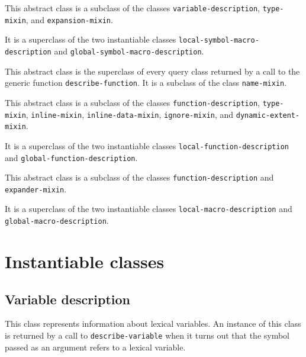 {\footnotesize
{}
}

This abstract class is a subclass of the classes
\texttt{variable-description}, \texttt{type-mixin}, and
\texttt{expansion-mixin}.

It is a superclass of the two instantiable classes
\texttt{local-symbol-macro-description} and
\texttt{global-symbol-macro-description}.

{\footnotesize
{}
}

This abstract class is the superclass of every query class returned by
a call to the generic function \texttt{describe-function}.  It is a
subclass of the class \texttt{name-mixin}.

{\footnotesize
{}
}

This abstract class is a subclass of the classes
\texttt{function-description}, \texttt{type-mixin},
\texttt{inline-mixin}, \texttt{inline-data-mixin},
\texttt{ignore-mixin}, and \texttt{dynamic-extent-mixin}.

It is a superclass of the two instantiable classes
\texttt{local-function-description} and
\texttt{global-function-description}.

{\footnotesize
{}
}

This abstract class is a subclass of the classes
\texttt{function-description} and \texttt{expander-mixin}.

It is a superclass of the two instantiable classes
\texttt{local-macro-description} and
\texttt{global-macro-description}.

\section{Instantiable classes}
\label{sec-instantiable-query-classes}

\subsection{Variable description}
\label{sec-instantiable-classes-variable-description}

{\footnotesize
{}
}

This class represents information about lexical variables.  An
instance of this class is returned by a call to \texttt{describe-variable}
when it turns out that the symbol passed as an argument refers to a
lexical variable.

